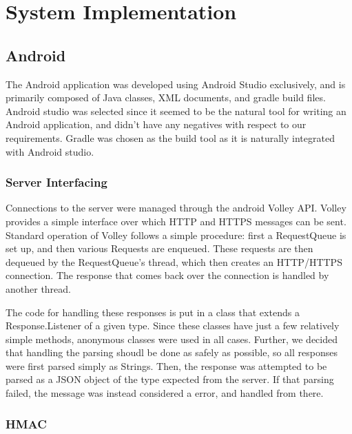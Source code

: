 \documentclass[12pt]{report}
\begin{document}

\chapter{System Implementation}


\section{Android}

The Android application was developed using Android Studio exclusively, and is primarily composed of Java classes, XML
documents, and gradle build files. Android studio was selected since it seemed to be the natural tool for writing an
Android application, and didn't have any negatives with respect to our requirements. Gradle was chosen as the build
tool as it is naturally integrated with Android studio.

\subsection{Server Interfacing}

Connections to the server were managed through the android Volley API. Volley provides a simple interface over which
HTTP and HTTPS messages can be sent. Standard operation of Volley follows a simple procedure: first a RequestQueue is
set up, and then various Requests are enqueued. These requests are then dequeued by the RequestQueue's thread, which
then creates an HTTP/HTTPS connection. The response that comes back over the connection is handled by another thread.

The code for handling these responses is put in a class that extends a Response.Listener of a given type. Since these
classes have just a few relatively simple methods, anonymous classes were used in all cases. Further, we decided that
handling the parsing shoudl be done as safely as possible, so all responses were first parsed simply as Strings. Then,
the response was attempted to be parsed as a JSON object of the type expected from the server. If that parsing failed,
the message was instead considered a error, and handled from there.

\subsection{HMAC}
\end{document}
